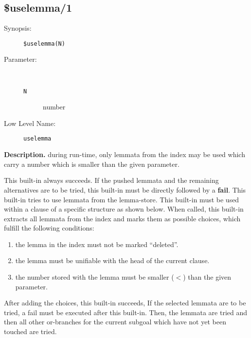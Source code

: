 %
%
%
\subsection{\$uselemma/1}\label{subsec:built-in-uselemma}


\begin{description}
\item[Synopsis:]
	{\tt \$uselemma(N)}
\item[Parameter:]\ \\[-0.5cm]
	\begin{description}
	\item[{\tt N}] number
	\end{description}
\item[Low Level Name:]
	{\tt uselemma}
\end{description}

\vspace*{0.5cm}
\noindent
{\bf Description.}
during run-time, only lemmata from the index may be used which carry
a number which is smaller than the given parameter.
 
 
This built-in always succeeds. If the pushed lemmata and the remaining
alternatives are to be tried, this built-in must be directly followed
by a {\bf fail}.
This built-in tries to use lemmata from the lemma-store.
This built-in must be used within a clause of a specific structure
as shown below.
When called, this built-in extracts all lemmata from the index
and marks them as possible choices, which fulfill the following conditions:
\begin{enumerate}
\item
the lemma in the index must not be marked ``deleted''.
\item
the lemma must be unifiable with the head of the current clause.
\item
the number stored with the lemma must be smaller ($<$) than the
given parameter.
\end{enumerate}
  
After adding the choices, this built-in succeeds, If the
selected lemmata are to be tried, a fail must be executed
after this built-in.
Then, the lemmata are tried and then
all other or-branches for
the current subgoal which have not yet been touched are tried.

